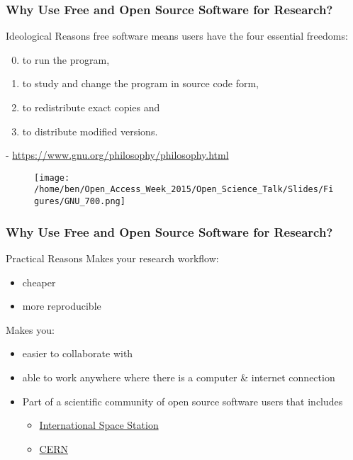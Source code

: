 \documentclass[xcolor=dvipsnames]{beamer}
\begin{document}
\begin{frame}
\frametitle{Why Use Free and Open Source Software for Research?}
\begin{block}{Ideological Reasons}
free software means users have the four essential freedoms: \begin{enumerate}
 \setcounter{enumi}{-1}
 \item to run the program, 
 \item to study and change the program in source code form,
 \item to redistribute exact copies and
 \item to distribute modified versions. \end{enumerate}
\begin{center} \small- \url{https://www.gnu.org/philosophy/philosophy.html}
\end{center}
\end{block}

\begin{center}
\begin{figure}
\texttt{[image: /home/ben/Open\_Access\_Week\_2015/Open\_Science\_Talk/Slides/Figures/GNU\_700.png]}
\end{figure}
\end{center}
\end{frame}

\begin{frame}
\frametitle{Why Use Free and Open Source Software for Research?}
\begin{block}{Practical Reasons}
Makes your research workflow:
\begin{itemize}
\item cheaper
\item more reproducible 
\newline
\end{itemize}

Makes you:
\begin{itemize}
\item easier to collaborate with 
\item able to work anywhere where there is a computer \& internet connection
\item Part of a scientific community of open source software users that includes \begin{itemize}
      \item \href{https://training.linuxfoundation.org/why-our-linux-training/training-reviews/linux-foundation-training-prepares-the-international-space-station-for-linux-migration}{International Space Station} 
      \item \href{https://linux.web.cern.ch/linux/scientific.shtml}{CERN}
\end{itemize}
\end{itemize}

\end{block}

\end{frame}
\end{document}
